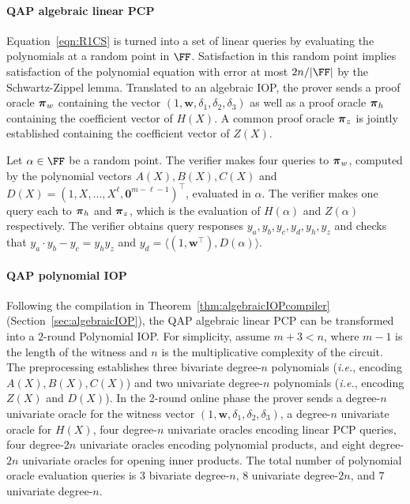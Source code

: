 \paragraph{QAP algebraic linear PCP} Equation~\ref{eqn:R1CS} is turned into a set of linear queries by evaluating the polynomials at a random point in $\FF$. Satisfaction in this random point implies satisfaction of the polynomial equation with error at most $2n / |\FF|$ by the Schwartz-Zippel lemma. Translated to an algebraic IOP, the prover sends a proof oracle $\boldsymbol{\pi}_w$ containing the vector $(1, \mathbf{w}, \delta_1, \delta_2, \delta_3)$ as well as a proof oracle $\boldsymbol{\pi}_h$ containing the coefficient vector of $H(X)$. A common proof oracle $\boldsymbol{\pi}_z$ is jointly established containing the coefficient vector of $Z(X)$. 

Let $\alpha \in \FF$ be a random point. The verifier makes four queries to $\boldsymbol{\pi}_w$, computed by the polynomial vectors $A(X), B(X), C(X)$ and $D(X) = (1, X,...,X^\ell, \mathbf{0}^{m- \ell -1})^\top$, evaluated in $\alpha$. The verifier makes one query each to $\boldsymbol{\pi}_h$ and $\boldsymbol{\pi}_z$, which is the evaluation of $H(\alpha)$ and $Z(\alpha)$ respectively. The verifier obtains query responses $y_a, y_b, y_c, y_d, y_h, y_z$ and checks that $y_a \cdot y_b - y_c = y_h y_z$ and $y_d = \langle (1, \mathbf{w}^\top), D(\alpha) \rangle$. 

\paragraph{QAP polynomial IOP} 

Following the compilation in Theorem~\ref{thm:algebraicIOPcompiler} (Section~\ref{sec:algebraicIOP}), the QAP algebraic linear PCP can be transformed into a $2$-round Polynomial IOP. For simplicity, assume $m+3 < n$, where $m-1$ is the length of the witness and $n$ is the multiplicative complexity of the circuit. The preprocessing establishes three bivariate degree-$n$ polynomials (\emph{i.e.}, encoding $A(X), B(X), C(X)$) and two univariate degree-$n$ polynomials (\emph{i.e.}, encoding $Z(X)$ and $D(X)$). In the 2-round online phase the prover sends a degree-$n$ univariate oracle for the witness vector $(1, \mathbf{w}, \delta_1, \delta_2, \delta_3)$, a degree-$n$ univariate oracle for $H(X)$, four degree-$n$ univariate oracles encoding linear PCP queries, four degree-$2n$ univariate oracles encoding polynomial products, and eight degree-$2n$ univariate oracles for opening inner products. The total number of polynomial oracle evaluation queries is $3$ bivariate degree-$n$, $8$ univariate degree-$2n$, and $7$ univariate degree-$n$. 

